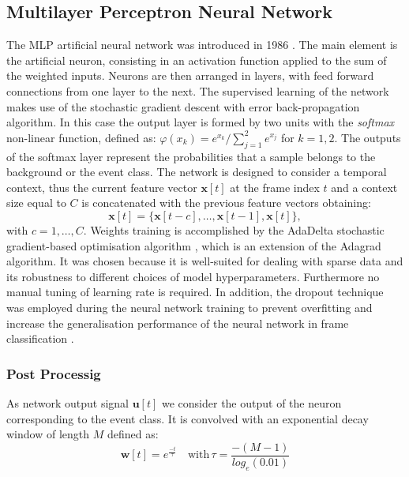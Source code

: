 \documentclass{article}
\begin{document}
\begin{sloppy}
\subsection{Multilayer Perceptron Neural Network}
The MLP artificial neural network was introduced in 1986 \cite{Rumelhart86-LRB}. The main element is the artificial neuron, consisting in an activation function applied to the sum of the weighted inputs. Neurons are then arranged in layers, with feed forward connections from one layer to the next. The supervised learning of the network makes use of the stochastic gradient descent with error back-propagation algorithm. In this case the output layer is formed by two units with the \textit{softmax} non-linear function, defined as:  $\varphi(x_k) = e^{x_k}/\sum_{j=1}^{2}e^{x_j}$ for $k=1,2$. The outputs of the softmax layer represent the probabilities that a sample belongs to the background or the event class. 
The network is designed to consider a temporal context, thus the current feature vector $\mathbf{x}[t]$ at the frame index $t$ and a context size equal to $C$ is concatenated with the previous feature vectors obtaining:
\begin{equation}
\mathbf{x}[t] =  \{\mathbf{x}[t - c],\ldots,\mathbf{x}[t-1],\mathbf{x}[t]\},
\end{equation}
with $c = 1, \dots, C$. Weights training is accomplished by the AdaDelta stochastic gradient-based optimisation algorithm \cite{zeiler2012adadelta}, which is an extension of the Adagrad \cite{duchi2011adaptive} algorithm. It was chosen because it is well-suited for dealing with sparse data and its robustness to different choices of model hyperparameters. Furthermore no manual tuning of learning rate is required. In addition, the dropout technique was employed during the neural network training to prevent overfitting and increase the generalisation performance of the neural network in frame classification \cite{srivastava2014dropout}. 

\subsubsection{Post Processig}
As network output signal $\mathbf{u}[t]$ we consider the output of the neuron corresponding to the event class. It is convolved with an exponential decay window of length $M$ defined as:
\begin{equation}
\mathbf{w}[t]= e^{\frac{−t}{\tau}} \quad \text{with}  \, \tau =  \frac{-(M-1)}{log_e(0.01)}
\end{equation}
		

\end{sloppy}
\end{document}
